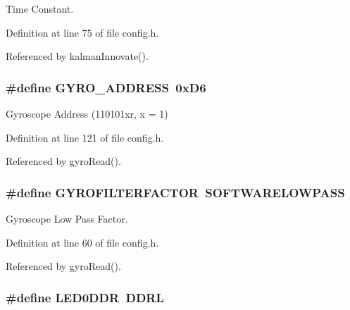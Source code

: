 Time Constant. 



Definition at line 75 of file config.\-h.



Referenced by kalman\-Innovate().

\hypertarget{group__config_ga8ed1f343e82440b4ef900e5fe42d74f0}{
\subsubsection[{G\-Y\-R\-O\-\_\-\-A\-D\-D\-R\-E\-S\-S}]{\setlength{\rightskip}{0pt plus 5cm}\#define G\-Y\-R\-O\-\_\-\-A\-D\-D\-R\-E\-S\-S~0x\-D6}}\label{group__config_ga8ed1f343e82440b4ef900e5fe42d74f0}


Gyroscope Address (110101xr, x = 1) 



Definition at line 121 of file config.\-h.



Referenced by gyro\-Read().

\hypertarget{group__config_ga1b5d47810976ecbfd688513246db3ba9}{
\subsubsection[{G\-Y\-R\-O\-F\-I\-L\-T\-E\-R\-F\-A\-C\-T\-O\-R}]{\setlength{\rightskip}{0pt plus 5cm}\#define G\-Y\-R\-O\-F\-I\-L\-T\-E\-R\-F\-A\-C\-T\-O\-R~{\bf S\-O\-F\-T\-W\-A\-R\-E\-L\-O\-W\-P\-A\-S\-S}}}\label{group__config_ga1b5d47810976ecbfd688513246db3ba9}


Gyroscope Low Pass Factor. 



Definition at line 60 of file config.\-h.



Referenced by gyro\-Read().

\hypertarget{group__config_ga86208659221ec2a932cd722dfc18101f}{
\subsubsection[{L\-E\-D0\-D\-D\-R}]{\setlength{\rightskip}{0pt plus 5cm}\#define L\-E\-D0\-D\-D\-R~D\-D\-R\-L}}\label{group__config_ga86208659221ec2a932cd722dfc18101f}


